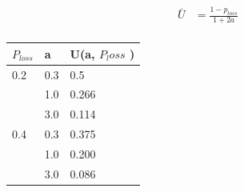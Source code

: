 \documentclass[12pt]{article}
\begin{document}
\begin{enumerate}[label=\textbf{Part \alph*)},leftmargin=*,align=left]
\begin{align*}
			\bar{U} & = \frac{ 1 - p_{loss} }{ 1 + 2a } \\
		\end{align*}
		\begin{tabular}{| l | l | l |  }
			\hline
			$P_{loss}$ & a & U(a, $P_loss$ ) \\ \hline
			0.2 & 0.3 & 0.5 \\ \hline
			      & 1.0 & 0.266 \\ \hline
			      & 3.0 & 0.114 \\ \hline
			0.4 & 0.3 & 0.375 \\ \hline
			      & 1.0 & 0.200 \\ \hline
			      & 3.0 & 0.086 \\ \hline
		\end{tabular}
\end{enumerate}
\end{document}
